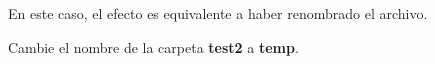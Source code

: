 \documentclass[11pt]{exam}
\begin{document}
\begin{questions}
\begin{parts}
En este caso, el efecto es equivalente a haber renombrado el archivo.

\item Cambie el nombre de la carpeta \textbf{test2} a \textbf{temp}.

\end{parts}

%
%
%
%
%
%
%
%
%
%
%
%

\end{questions}
\end{document}
